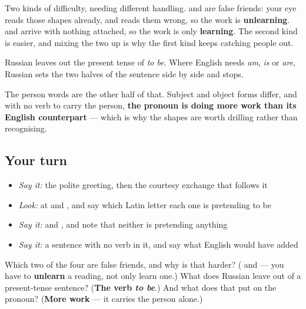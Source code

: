 Two kinds of difficulty, needing different handling. \textbf{} and \textbf{} are false friends: your eye reads those shapes already, and reads them wrong, so the work is \textbf{unlearning}. \textbf{} and \textbf{} arrive with nothing attached, so the work is only \textbf{learning}. The second kind is easier, and mixing the two up is why the first kind keeps catching people out.

\begin{grammarlens}[title={Grammar Lens: the verb that is not there}]
Russian leaves out the present tense of \emph{to be}. Where English needs \emph{am}, \emph{is} or \emph{are}, Russian sets the two halves of the sentence side by side and stops.

The person words are the other half of that. Subject and object forms differ, and with no verb to carry the person, \textbf{the pronoun is doing more work than its English counterpart} — which is why the shapes are worth drilling rather than recognising.
\end{grammarlens}

\subsection*{Your turn}
\begin{itemize}
\raggedright
  \item \emph{Say it:} the polite greeting, then the courtesy exchange that follows it
  \item \emph{Look:} at  and , and say which Latin letter each one is pretending to be
  \item \emph{Say it:}  and , and note that neither is pretending anything
  \item \emph{Say it:} a sentence with no verb in it, and say what English would have added
\end{itemize}

\begin{tcolorbox}[breakable,colback=teal!4,colframe=teal!35!black,title={Before you move on}]
Which two of the four are false friends, and why is that harder? (\textbf{} and \textbf{} — you have to \textbf{unlearn} a reading, not only learn one.) What does Russian leave out of a present-tense sentence? (\textbf{The verb \emph{to be}}.) And what does that put on the pronoun? (\textbf{More work} — it carries the person alone.)
\end{tcolorbox}
